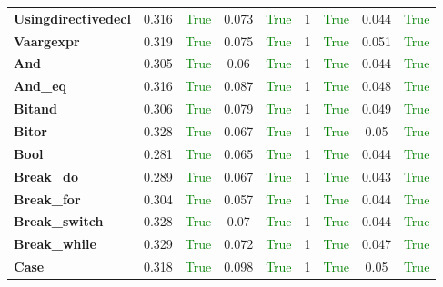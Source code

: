 \documentclass{article}
\begin{document}
\begin{xltabular}{\textwidth}{lcccccccc}
\textbf{{\fontsize{10}{12}\selectfont Usingdirectivedecl}}& 0.316&\textcolor{green}{True}& 0.073&\textcolor{green}{True}& 1&\textcolor{green}{True}& 0.044&\textcolor{green}{True} \\[0.5ex]
\textbf{{\fontsize{10}{12}\selectfont Vaargexpr}}& 0.319&\textcolor{green}{True}& 0.075&\textcolor{green}{True}& 1&\textcolor{green}{True}& 0.051&\textcolor{green}{True} \\[0.5ex]
\textbf{{\fontsize{10}{12}\selectfont And}}& 0.305&\textcolor{green}{True}& 0.06&\textcolor{green}{True}& 1&\textcolor{green}{True}& 0.044&\textcolor{green}{True} \\[0.5ex]
\textbf{{\fontsize{10}{12}\selectfont And\_eq}}& 0.316&\textcolor{green}{True}& 0.087&\textcolor{green}{True}& 1&\textcolor{green}{True}& 0.048&\textcolor{green}{True} \\[0.5ex]
\textbf{{\fontsize{10}{12}\selectfont Bitand}}& 0.306&\textcolor{green}{True}& 0.079&\textcolor{green}{True}& 1&\textcolor{green}{True}& 0.049&\textcolor{green}{True} \\[0.5ex]
\textbf{{\fontsize{10}{12}\selectfont Bitor}}& 0.328&\textcolor{green}{True}& 0.067&\textcolor{green}{True}& 1&\textcolor{green}{True}& 0.05&\textcolor{green}{True} \\[0.5ex]
\textbf{{\fontsize{10}{12}\selectfont Bool}}& 0.281&\textcolor{green}{True}& 0.065&\textcolor{green}{True}& 1&\textcolor{green}{True}& 0.044&\textcolor{green}{True} \\[0.5ex]
\textbf{{\fontsize{10}{12}\selectfont Break\_do}}& 0.289&\textcolor{green}{True}& 0.067&\textcolor{green}{True}& 1&\textcolor{green}{True}& 0.043&\textcolor{green}{True} \\[0.5ex]
\textbf{{\fontsize{10}{12}\selectfont Break\_for}}& 0.304&\textcolor{green}{True}& 0.057&\textcolor{green}{True}& 1&\textcolor{green}{True}& 0.044&\textcolor{green}{True} \\[0.5ex]
\textbf{{\fontsize{10}{12}\selectfont Break\_switch}}& 0.328&\textcolor{green}{True}& 0.07&\textcolor{green}{True}& 1&\textcolor{green}{True}& 0.044&\textcolor{green}{True} \\[0.5ex]
\textbf{{\fontsize{10}{12}\selectfont Break\_while}}& 0.329&\textcolor{green}{True}& 0.072&\textcolor{green}{True}& 1&\textcolor{green}{True}& 0.047&\textcolor{green}{True} \\[0.5ex]
\textbf{{\fontsize{10}{12}\selectfont Case}}& 0.318&\textcolor{green}{True}& 0.098&\textcolor{green}{True}& 1&\textcolor{green}{True}& 0.05&\textcolor{green}{True} \\[0.5ex]

\end{xltabular}
\end{document}
